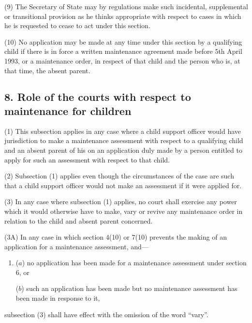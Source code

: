 \documentclass[12pt,a4paper]{article}
\begin{document}
(9) The Secretary of State may by regulations make such incidental, supplemental or transitional provision as he thinks appropriate with respect to cases in which he is requested to cease to act under this section.

(10) No application may be made at any time under this section by a qualifying child if there is in force a written maintenance agreement made before 5th April 1993, or a maintenance order, in respect of that child and the person who is, at that time, the absent parent.


\subsection{8. Role of the courts with respect to maintenance for children}

(1) This subsection applies in any case where a child support officer would have jurisdiction to make a maintenance assessment with respect to a qualifying child and an absent parent of his on an application duly made by a person entitled to apply for such an assessment with respect to that child.

(2) Subsection (1)  applies even though the circumstances of the case are such that a child support officer would not make an assessment if it were applied for.

(3) In any case where subsection (1)  applies, no court shall exercise any power which it would otherwise have to make, vary or revive any maintenance order in relation to the child and absent parent concerned.

(3A) In any case in which section 4(10) or 7(10) prevents the making of an application for a maintenance assessment, and—
\begin{enumerate}\item[]
($a$) no application has been made for a maintenance assessment under section 6, or

($b$) such an application has been made but no maintenance assessment has been made in response to it,
\end{enumerate}
subsection (3) shall have effect with the omission of the word “vary”.
\end{document}
